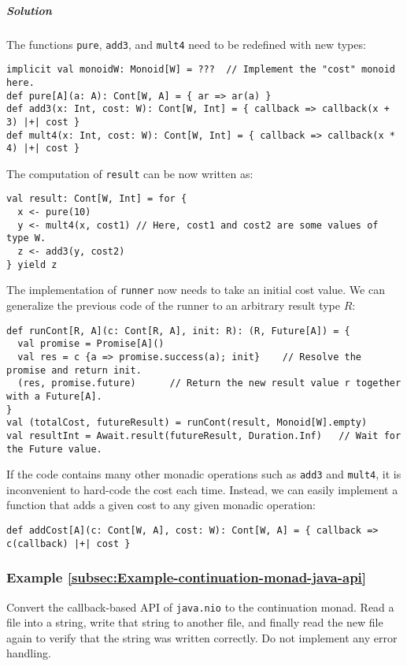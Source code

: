 \subparagraph{Solution}

The functions \lstinline!pure!, \lstinline!add3!, and \lstinline!mult4!
need to be redefined with new types:
\begin{lstlisting}
implicit val monoidW: Monoid[W] = ???  // Implement the "cost" monoid here.
def pure[A](a: A): Cont[W, A] = { ar => ar(a) }
def add3(x: Int, cost: W): Cont[W, Int] = { callback => callback(x + 3) |+| cost }
def mult4(x: Int, cost: W): Cont[W, Int] = { callback => callback(x * 4) |+| cost }
\end{lstlisting}
The computation of \lstinline!result! can be now written as:
\begin{lstlisting}
val result: Cont[W, Int] = for {
  x <- pure(10)
  y <- mult4(x, cost1) // Here, cost1 and cost2 are some values of type W.
  z <- add3(y, cost2)
} yield z
\end{lstlisting}
The implementation of \lstinline!runner! now needs to take an initial
cost value. We can generalize the previous code of the runner to an
arbitrary result type $R$:
\begin{lstlisting}
def runCont[R, A](c: Cont[R, A], init: R): (R, Future[A]) = {
  val promise = Promise[A]()
  val res = c {a => promise.success(a); init}    // Resolve the promise and return init.
  (res, promise.future)      // Return the new result value r together with a Future[A].
}
val (totalCost, futureResult) = runCont(result, Monoid[W].empty)
val resultInt = Await.result(futureResult, Duration.Inf)   // Wait for the Future value.
\end{lstlisting}

If the code contains many other monadic operations such as \lstinline!add3!
and \lstinline!mult4!, it is inconvenient to hard-code the cost each
time. Instead, we can easily implement a function that adds a given
cost to any given monadic operation:
\begin{lstlisting}
def addCost[A](c: Cont[W, A], cost: W): Cont[W, A] = { callback => c(callback) |+| cost }
\end{lstlisting}


\subsubsection{Example \label{subsec:Example-continuation-monad-java-api}\ref{subsec:Example-continuation-monad-java-api}}

Convert the callback-based API of \lstinline!java.nio! to the continuation
monad. Read a file into a string, write that string to another file,
and finally read the new file again to verify that the string was
written correctly. Do not implement any error handling.

